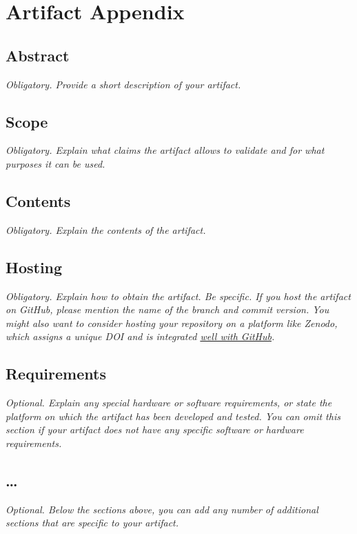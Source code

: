 \documentclass{article}
\begin{document}

\appendix
\section{Artifact Appendix}

\subsection*{Abstract}

{\em Obligatory. Provide a short description of your artifact.}

\subsection*{Scope}

{\em Obligatory. Explain what claims the artifact allows to validate and for what purposes it can be used.}

\subsection*{Contents}

{\em Obligatory. Explain the contents of the artifact.}

\subsection*{Hosting}

{\em Obligatory. Explain how to obtain the artifact. Be specific. If you host the artifact on GitHub, please mention the name of the branch and commit version. You might also want to consider hosting your repository on a platform like Zenodo, which assigns a unique DOI and is integrated \href{https://guides.github.com/activities/citable-code/}{well with GitHub}.}

\subsection*{Requirements}

{\em Optional. Explain any special hardware or software requirements, or state the platform on which the artifact has been developed and tested. You can omit this section if your artifact does not have any specific software or hardware requirements.}

\subsection*{\ldots{}}

{\em Optional. Below the sections above, you can add any number of additional sections that are specific to your artifact.}
\end{document}
